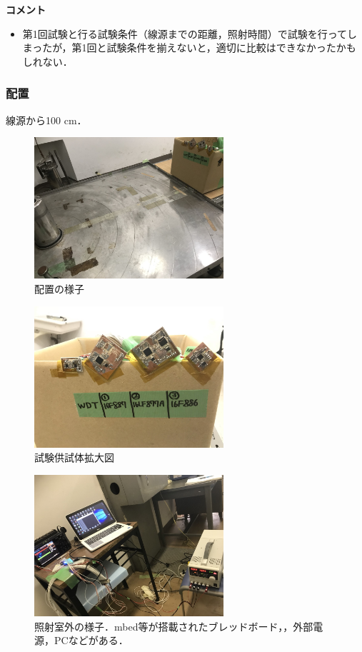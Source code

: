 \vspace{2ex} 
\textbf{コメント}
\begin{itemize}
	\item 第1回試験と行る試験条件（線源までの距離，照射時間）で試験を行ってしまったが，第1回と試験条件を揃えないと，適切に比較はできなかったかもしれない．
\end{itemize}

\subsubsection{配置}
線源から100 cm．

\begin{figure}[H]
	\centering
	\includegraphics[width=70mm]{04/fig/4-1-3.jpg}
	\caption{配置の様子}
	\label{fig4-1-3}
\end{figure}
\begin{figure}[H]
	\centering
	\includegraphics[width=70mm]{04/fig/4-1-4.jpg}
	\caption{試験供試体拡大図}
	\label{fig4-1-4}
\end{figure}
\begin{figure}[H]
	\centering
	\includegraphics[width=70mm]{04/fig/4-1-5.jpg}
	\caption{照射室外の様子．mbed等が搭載されたブレッドボード，，外部電源，PCなどがある．}
	\label{fig4-1-5}
\end{figure}

